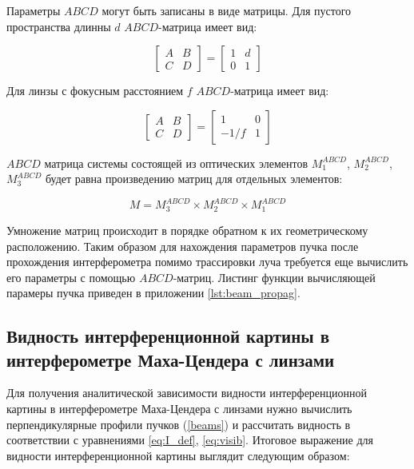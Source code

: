 Параметры $ABCD$ могут быть записаны в виде матрицы. Для пустого пространства длинны $d$ $ABCD$-матрица имеет вид: 

\begin{equation}
    \begin{bmatrix} A & B \\ C & D \end{bmatrix}=\begin{bmatrix} 1 & d \\ 0 & 1 \end{bmatrix}
\label{eq:abcd_free}
\end{equation}

Для линзы с фокусным расстоянием $f$ $ABCD$-матрица имеет вид: 

\begin{equation}
    \begin{bmatrix} A & B \\ C & D \end{bmatrix}=\begin{bmatrix} 1 & 0 \\ -1/f & 1 \end{bmatrix}
\label{eq:abcd_lens}
\end{equation}

$ABCD$ матрица системы состоящей из оптических элементов $M_1^{ABCD}$, $M_2^{ABCD}$, $M_3^{ABCD}$ будет равна произведению матриц для отдельных элементов:

\begin{equation}
    M = M_3^{ABCD} \times M_2^{ABCD} \times M_1^{ABCD}
\label{eq:abcd_prod}
\end{equation}

Умножение матриц происходит в порядке обратном к их геометрическому расположению. Таким образом для нахождения параметров пучка после прохождения интерферометра помимо трассировки луча требуется еще вычислить его параметры с помощью $ABCD$-матриц. Листинг функции вычисляющей парамеры пучка приведен в приложении \ref{lst:beam_propag}.

\subsection{Видность интерференционной картины в интерферометре Маха-Цендера с линзами}\label{sec:ch2/sec1/subsec5}

Для получения аналитической зависимости видности интерференционной картины в интерферометре Маха-Цендера с линзами нужно вычислить перпендикулярные профили пучков  (\ref{beams}) и рассчитать видность в соответствии с уравнениями \eqref{eq:I_def}, \eqref{eq:visib}. Итоговое выражение для видности интерференционной картины выглядит следующим образом:

